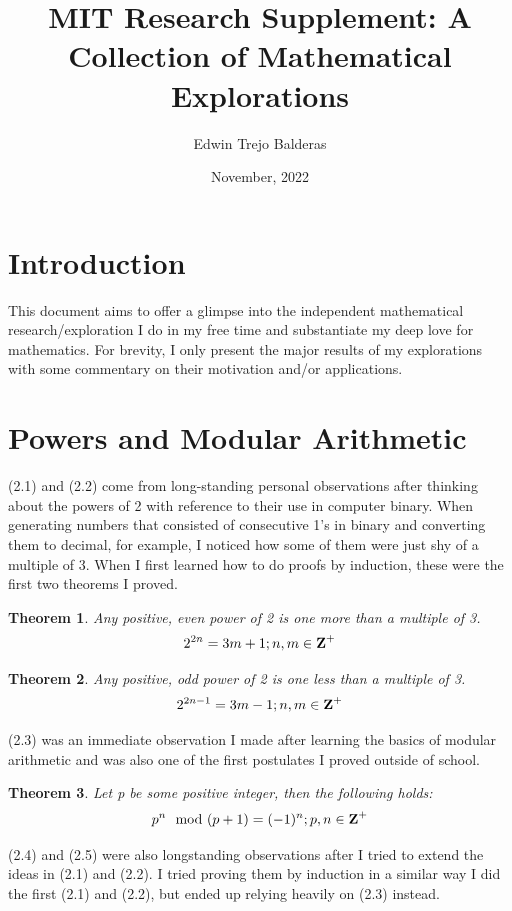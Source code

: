 \documentclass{article}
\title{MIT Research Supplement: A Collection of Mathematical Explorations}
\author{Edwin Trejo Balderas}
\date{November, 2022}
\newtheorem{theorem}{Theorem}[section]
\begin{document}
\maketitle

\section{Introduction}
This document aims to offer a glimpse into the independent mathematical research/exploration I do in my free time and substantiate my deep love for mathematics. For brevity, I only present the major results of my explorations with some commentary on their motivation and/or applications.

\section{Powers and Modular Arithmetic}

(2.1) and (2.2) come from long-standing personal observations after thinking about the powers of 2 with reference to their use in computer binary. When generating numbers that consisted of consecutive 1's in binary and converting them to decimal, for example, I noticed how some of them were just shy of a multiple of 3. When I first learned how to do proofs by induction, these were the first two theorems I proved.

\begin{theorem}
    Any positive, even power of 2 is one more than a multiple of 3. 
    $$2^{2n}=3m+1;n,m\in\mbox{\textbf{Z}}^+$$
\end{theorem}

\begin{theorem}
    Any positive, odd power of 2 is one less than a multiple of 3. 
    $$2^{2n-1}=3m-1;n,m\in\mbox{\textbf{Z}}^+$$
\end{theorem}

(2.3) was an immediate observation I made after learning the basics of modular arithmetic and was also one of the first postulates I proved outside of school.

\begin{theorem}
    Let \mbox{p} be some positive integer, then the following holds:
    $$p^n\mod{(p+1)}=(-1)^n;p,n\in\mbox{\textbf{Z}}^+$$
\end{theorem}

(2.4) and (2.5) were also longstanding observations after I tried to extend the ideas in (2.1) and (2.2). I tried proving them by induction in a similar way I did the first (2.1) and (2.2), but ended up relying heavily on (2.3) instead.
\end{document}
